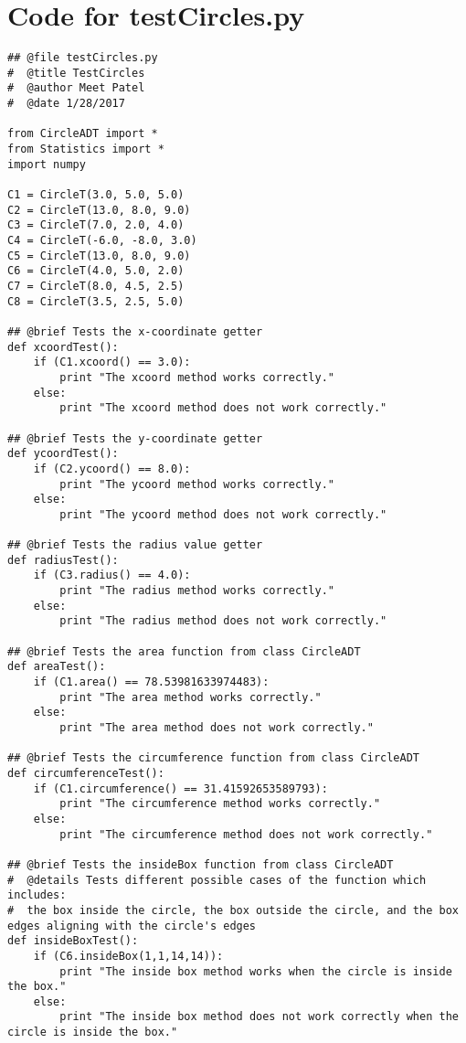 \documentclass[12pt]{article}
\begin{document}
\newpage

\section{Code for testCircles.py} \label{MyTestSect}
\begin{lstlisting}
## @file testCircles.py
#  @title TestCircles
#  @author Meet Patel
#  @date 1/28/2017

from CircleADT import *
from Statistics import *
import numpy

C1 = CircleT(3.0, 5.0, 5.0)
C2 = CircleT(13.0, 8.0, 9.0)
C3 = CircleT(7.0, 2.0, 4.0)
C4 = CircleT(-6.0, -8.0, 3.0)
C5 = CircleT(13.0, 8.0, 9.0)
C6 = CircleT(4.0, 5.0, 2.0)
C7 = CircleT(8.0, 4.5, 2.5)
C8 = CircleT(3.5, 2.5, 5.0)

## @brief Tests the x-coordinate getter
def xcoordTest():
    if (C1.xcoord() == 3.0):
        print "The xcoord method works correctly."
    else:
        print "The xcoord method does not work correctly."

## @brief Tests the y-coordinate getter
def ycoordTest():
    if (C2.ycoord() == 8.0):
        print "The ycoord method works correctly."
    else:
        print "The ycoord method does not work correctly."

## @brief Tests the radius value getter
def radiusTest():
    if (C3.radius() == 4.0):
        print "The radius method works correctly."
    else:
        print "The radius method does not work correctly."

## @brief Tests the area function from class CircleADT
def areaTest():
    if (C1.area() == 78.53981633974483):
        print "The area method works correctly."
    else:
        print "The area method does not work correctly."

## @brief Tests the circumference function from class CircleADT
def circumferenceTest():
    if (C1.circumference() == 31.41592653589793):
        print "The circumference method works correctly."
    else:
        print "The circumference method does not work correctly."

## @brief Tests the insideBox function from class CircleADT
#  @details Tests different possible cases of the function which includes:
#  the box inside the circle, the box outside the circle, and the box edges aligning with the circle's edges
def insideBoxTest():
    if (C6.insideBox(1,1,14,14)):
        print "The inside box method works when the circle is inside the box."
    else:
        print "The inside box method does not work correctly when the circle is inside the box."


\end{lstlisting}
\end{document}
